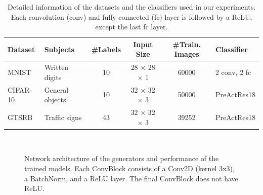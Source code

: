 \documentclass{article}
\begin{document}
\begin{table}[h]
    \centering
    \caption{Detailed information of the datasets and the classifiers used in our experiments. Each convolution (conv) and fully-connected (fc) layer is followed by a  ReLU, except the last fc layer. }
    \vskip 0.05in
    \label{tab:dataset_detail}
    \begin{tabu} to \textwidth {llcccl}
    \toprule
    Dataset & Subjects & \#Labels & Input Size & \#Train. Images & Classifier\\
    \midrule
    MNIST & Written digits & 10 & 28 $\times$ 28 $\times$ 1 & 60000 & 2 conv, 2 fc\\
    CIFAR-10 & General objects & 10 & 32 $\times$ 32 $\times$ 3 & 50000 & PreActRes18 \cite{he2016identity}\\
    GTSRB & Traffic signs & 43 & 32 $\times$ 32 $\times$ 3 & 39252 & PreActRes18 \cite{he2016identity}\\
    \bottomrule
    \end{tabu}
    \vspace{-1.0em}
\end{table}

\begin{figure}[t]
\centering
{}
~
\caption{Network architecture of the generators and performance of the trained models. Each ConvBlock consists of a Conv2D (kernel 3x3), a BatchNorm, and a ReLU layer. The final ConvBlock does not have ReLU. }
\vspace{-6mm}
\label{fig:samples}
\end{figure}
\end{document}
